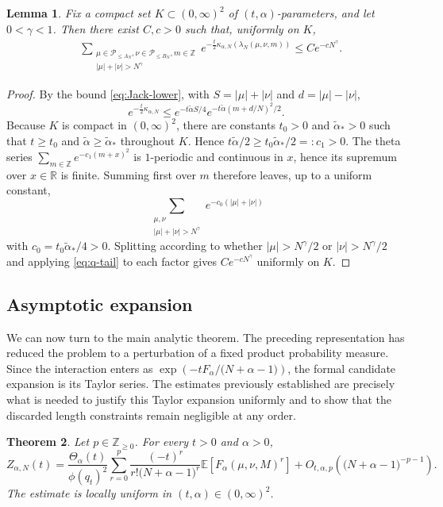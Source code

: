 \documentclass[11pt,a4paper,reqno]{article}
\newtheorem{theorem}{Theorem}[section]
\newtheorem{lemma}[theorem]{Lemma}
\theoremstyle{definition}
\theoremstyle{remark}
\newcommand\Z{{\mathbb Z}}
\newcommand\R{{\mathbb R}}
\newcommand\E{{\mathbb E}}
\newcommand\Pcal{{\mathcal P}}
\begin{document}
\begin{lemma}\label{lem:trace-tail}
Fix a compact set $K\subset(0,\infty)^2$ of $(t,\alpha)$-parameters, and let $0<\gamma<1$.  Then there exist $C,c>0$ such that, uniformly on $K$,
\begin{align}\label{eq:trace-tail}
&\sum_{\substack{\mu\in\Pcal_{\leq A_N},\nu\in\Pcal_{\leq B_N},m\in\Z\\
|\mu|+|\nu|>N^\gamma}}
e^{-\frac t2\kappa_{\alpha,N}(\lambda_N(\mu,\nu,m))}
\leq Ce^{-cN^\gamma}.
\end{align}
\end{lemma}

\begin{proof}
By the bound \eqref{eq:Jack-lower}, with $S=|\mu|+|\nu|$ and $d=|\mu|-|\nu|$,
\[
e^{-\frac t2\kappa_{\alpha,N}} \leq e^{-t\widetilde\alpha S/4} e^{-t\widetilde\alpha(m+d/N)^2/2}.
\]
Because $K$ is compact in $(0,\infty)^2$, there are constants $t_0>0$ and $\widetilde\alpha_*>0$ such that $t\geq t_0$ and $\widetilde\alpha\geq\widetilde\alpha_*$ throughout $K$.  Hence $t\widetilde\alpha/2\geq t_0\widetilde\alpha_*/2=:c_1>0$.  The theta series $\sum_{m\in\Z}e^{-c_1(m+x)^2}$ is $1$-periodic and continuous in $x$, hence its supremum over $x\in\R$ is finite.  Summing first over $m$ therefore leaves, up to a uniform constant,
\[
\sum_{\substack{\mu,\nu\\ |\mu|+|\nu|>N^\gamma}}
e^{-c_0(|\mu|+|\nu|)}
\]
with $c_0=t_0\widetilde\alpha_*/4>0$.  Splitting according to whether $|\mu|>N^\gamma/2$ or $|\nu|>N^\gamma/2$ and applying \eqref{eq:q-tail} to each factor gives $Ce^{-cN^\gamma}$ uniformly on $K$.
\end{proof}

\subsection{Asymptotic expansion}\label{subsec:heat-trace-asymptotics}

We can now turn to the main analytic theorem.  The preceding representation has reduced the problem to a perturbation of a fixed product probability measure.  Since the interaction enters as $\exp(-tF_\alpha/\bigl(N+\alpha-1\bigr))$, the formal candidate expansion is its Taylor series.  The estimates previously established are precisely what is needed to justify this Taylor expansion uniformly and to show that the discarded length constraints remain negligible at any order.

\begin{theorem}\label{thm:heat-expansion}
Let $p\in\Z_{\geq0}$.  For every $t>0$ and $\alpha>0$,
\begin{equation}\label{eq:heat-expansion}
Z_{\alpha,N}(t) =\frac{\Theta_\alpha(t)}{\phi(q_t)^2} \sum_{r=0}^{p} \frac{(-t)^r}{r!\bigl(N+\alpha-1\bigr)^r} \E\left[F_\alpha(\mu,\nu,M)^r\right] +O_{t,\alpha,p}(\bigl(N+\alpha-1\bigr)^{-p-1}).
\end{equation}
The estimate is locally uniform in $(t,\alpha)\in(0,\infty)^2$.
\end{theorem}
\end{document}
